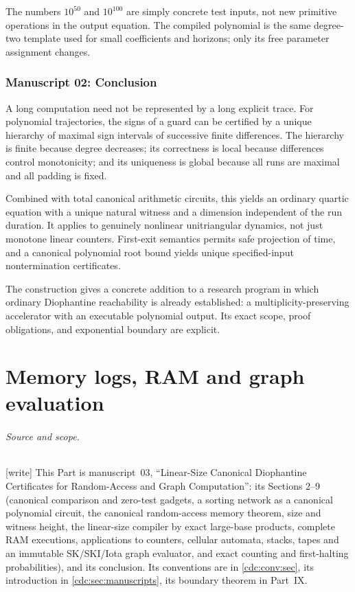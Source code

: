 \documentclass[11pt,a4paper]{article}
\theoremstyle{definition}
\theoremstyle{remark}
\newcommand{\wtag}{\textup{[write]}}%
\newcommand{\srctag}[1]{\texorpdfstring{\hspace{0.5em}{\normalfont\small\color{accent}[#1]}}{ [#1]}}
\begin{document}
The numbers $10^{50}$ and $10^{100}$ are simply concrete test inputs,
not new primitive operations in the output equation. The compiled
polynomial is the same degree-two template used for small coefficients
and horizons; only its free parameter assignment changes.


\section{Manuscript 02: Conclusion\srctag{02}}
A long computation need not be represented by a long explicit trace.
For polynomial trajectories, the signs of a guard can be certified by a
unique hierarchy of maximal sign intervals of successive finite
differences. The hierarchy is finite because degree decreases; its
correctness is local because differences control monotonicity; and its
uniqueness is global because all runs are maximal and all padding is fixed.

Combined with total canonical arithmetic circuits, this yields an
ordinary quartic equation with a unique natural witness and a dimension
independent of the run duration. It applies to genuinely nonlinear
unitriangular dynamics, not just monotone linear counters. First-exit
semantics permits safe projection of time, and a canonical polynomial
root bound yields unique specified-input nontermination certificates.

The construction gives a concrete addition to a research program in which
ordinary Diophantine reachability is already established: a
multiplicity-preserving accelerator with an executable polynomial output.
Its exact scope, proof obligations, and exponential boundary are explicit.


\part{Memory logs, RAM and graph evaluation}\label{cdc:part:memory}

\paragraph{Source and scope.} \wtag{} This Part is manuscript~03, ``Linear-Size Canonical Diophantine Certificates for Random-Access and Graph Computation'': its Sections 2--9 (canonical comparison and zero-test gadgets, a sorting network as a canonical polynomial circuit, the canonical random-access memory theorem, size and witness height, the linear-size compiler by exact large-base products, complete RAM executions, applications to counters, cellular automata, stacks, tapes and an immutable SK/SKI/Iota graph evaluator, and exact counting and first-halting probabilities), and its conclusion. Its conventions are in \cref{cdc:conv:sec}, its introduction in \cref{cdc:sec:manuscripts}, its boundary theorem in Part~IX.
\end{document}
